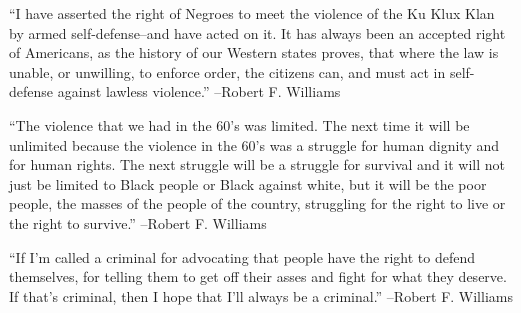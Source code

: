 \documentclass{article}%
\begin{document}
\linebreak%
\vspace{1mm}%
\begin{minipage}{\textwidth}%
\flushleft%
“I have asserted the right of Negroes to meet the violence of the Ku Klux Klan by armed self{-}defense–and have acted on it. It has always been an accepted right of Americans, as the history of our Western states proves, that where the law is unable, or unwilling, to enforce order, the citizens can, and must act in self{-}defense against lawless violence.”%
\linebreak%
\vspace{1mm}%
–Robert F. Williams%
\linebreak%
\vspace{1mm}%
\end{minipage}%
\linebreak%
\vspace{1mm}%
\begin{minipage}{\textwidth}%
\flushleft%
“The violence that we had in the 60's was limited. The next time it will be unlimited because the violence in the 60's was a struggle for human dignity and for human rights. The next struggle will be a struggle for survival and it will not just be limited to Black people or Black against white, but it will be the poor people, the masses of the people of the country, struggling for the right to live or the right to survive.”%
\linebreak%
\vspace{1mm}%
–Robert F. Williams%
\linebreak%
\vspace{1mm}%
\end{minipage}%
\linebreak%
\vspace{1mm}%
\begin{minipage}{\textwidth}%
\flushleft%
“If I'm called a criminal for advocating that people have the right to defend themselves, for telling them to get off their asses and fight for what they deserve. If that's criminal, then I hope that I'll always be a criminal.”%
\linebreak%
\vspace{1mm}%
–Robert F. Williams%
\linebreak%
\vspace{1mm}%
\end{minipage}%
\linebreak%
\vspace{1mm}%
\end{document}
